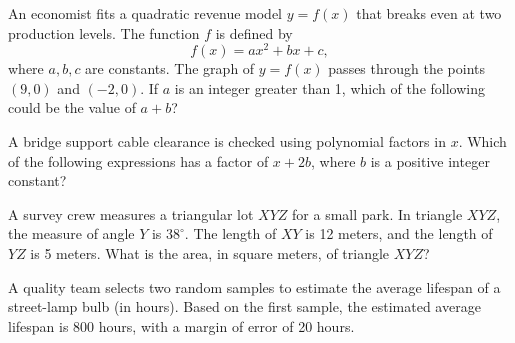 \vspace{2em}
\newpage

\noindent\markforreview
\vspace{1em}

An economist fits a quadratic revenue model \(y = f(x)\) that breaks even at two production levels. The function \(f\) is defined by
\[
f(x) = ax^2 + bx + c,
\]
where \(a, b, c\) are constants. The graph of \(y = f(x)\) passes through the points \((9, 0)\) and \((-2, 0)\). If \(a\) is an integer greater than 1, which of the following could be the value of \(a + b\)?

\vspace{0.75em}


\vspace{2em}
\newpage

\noindent\markforreview
\vspace{1em}

A bridge support cable clearance is checked using polynomial factors in \(x\). Which of the following expressions has a factor of \(x + 2b\), where \(b\) is a positive integer constant?

\vspace{0.75em}


\vspace{2em}
\newpage

\noindent\markforreview
\vspace{1em}

A survey crew measures a triangular lot \(XYZ\) for a small park. In triangle \(XYZ\), the measure of angle \(Y\) is \(38^\circ\). The length of \(XY\) is 12 meters, and the length of \(YZ\) is 5 meters. What is the area, in square meters, of triangle \(XYZ\)?

\vspace{0.75em}


\vspace{2em}
\newpage

\noindent\markforreview
\vspace{1em}

A quality team selects two random samples to estimate the average lifespan of a street-lamp bulb (in hours). Based on the first sample, the estimated average lifespan is 800 hours, with a margin of error of 20 hours.

